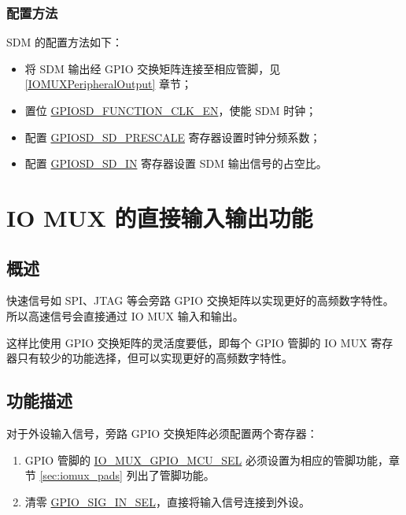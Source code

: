 \documentclass[main\_\_CN.tex]{subfiles}
\begin{document}
\subsubsection{配置方法}

SDM 的配置方法如下：

\begin{itemize}
    \item 将 SDM 输出经 GPIO 交换矩阵连接至相应管脚，见 \ref{IOMUXPeripheralOutput} 章节；
    \item 置位 \hyperref[fielddesc:GPIOSDFUNCTIONCLKEN]{GPIOSD\_FUNCTION\_CLK\_EN}，使能 SDM 时钟；
    \item 配置 \hyperref[fielddesc:GPIOSDSDNPRESCALE]{GPIOSD\_SD\_PRESCALE} 寄存器设置时钟分频系数；
    \item 配置 \hyperref[fielddesc:GPIOSDSDNIN]{GPIOSD\_SD\_IN} 寄存器设置 SDM 输出信号的占空比。
\end{itemize}

\section{IO MUX 的直接输入输出功能}

\subsection{概述}

快速信号如 SPI、JTAG 等会旁路 GPIO 交换矩阵以实现更好的高频数字特性。所以高速信号会直接通过 IO MUX 输入和输出。

这样比使用 GPIO 交换矩阵的灵活度要低，即每个 GPIO 管脚的 IO MUX 寄存器只有较少的功能选择，但可以实现更好的高频数字特性。

\subsection{功能描述}

对于外设输入信号，旁路 GPIO 交换矩阵必须配置两个寄存器：

\begin{enumerate}
\item GPIO 管脚的 \hyperref[fielddesc:IOMUXGPIONMCUSEL]{IO\_MUX\_GPIO\_MCU\_SEL} 必须设置为相应的管脚功能，章节 \ref{sec:iomux_pads} 列出了管脚功能。
\item 清零 \hyperref[fielddesc:GPIOSIGNINSEL]{GPIO\_SIG\_IN\_SEL}，直接将输入信号连接到外设。
\end{enumerate}
\end{document}

